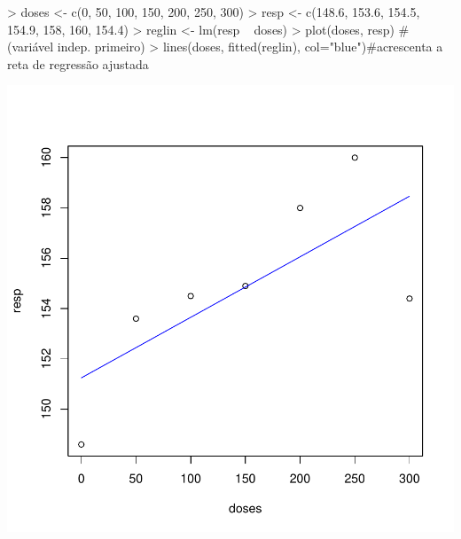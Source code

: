 \documentclass[14pt,aspectratio=1610]{beamer}
\begin{document}
\begin{frame}[fragile]{}
\frametitle{ }
\begin{block}{}
\begin{center}
\begin{Schunk}
\begin{Sinput}
> doses <- c(0, 50, 100, 150, 200, 250, 300)
> resp <- c(148.6, 153.6, 154.5, 154.9, 158, 160, 154.4)
> reglin <- lm(resp ~ doses) 
> plot(doses, resp) #(variável indep. primeiro)
> lines(doses, fitted(reglin), col="blue")#acrescenta a reta de regressão ajustada
\end{Sinput}
\end{Schunk}
\end{center}
\end{block}
\vspace{-1.3cm}
\begin{center}
\includegraphics{Aula17-004}
\end{center}
\end{frame}
\end{document}
